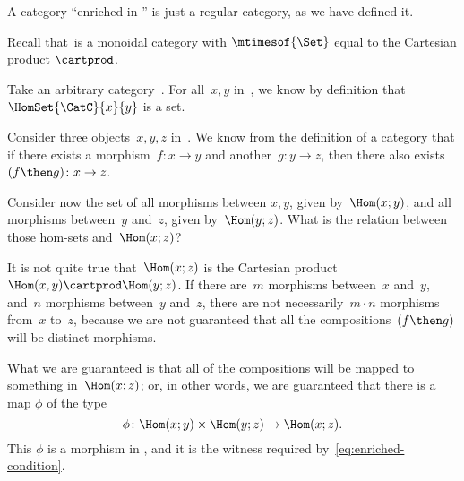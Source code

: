 \begin{example}
\end{example}

\begin{example}
    A category ``enriched in \Set'' is just a regular category, as we have defined it.

    Recall that~\Set is a monoidal category with $\mtimesof{\Set}$ equal to the Cartesian product $\cartprod$.

    Take an arbitrary category~\CatC.
    For all~$x, y$ in~\CatC, we know by definition that~$\HomSet{\CatC}{x}{y}$ is a set.

    Consider three objects~$x,y,z$ in~\CatC.
    We know from the definition of a category that if there exists a morphism~$f: x \to y$ and another~$g: y \to z$, then there also exists~$(f\then g)\colon x \to z$.

    Consider now the set of all morphisms between $x, y$, given by~$\Hom(x;y)$, and all morphisms between~$y$ and~$z$, given by~$\Hom(y; z)$.
    What is the relation between those hom-sets and~$\Hom(x; z)$?

    It is not quite true that~$\Hom(x; z)$ is the Cartesian product~$\Hom(x, y) \cartprod \Hom(y; z)$.
    If there are~$m$ morphisms between~$x$ and~$y$, and~$n$ morphisms between~$y$ and~$z$, there are not necessarily~$m \cdot n$ morphisms from~$x$ to~$z$, because we are not guaranteed that all the compositions~$(f\then g)$ will be distinct morphisms.

    What we are guaranteed is that all of the compositions will be mapped to something in~$\Hom(x; z)$; or, in other words, we are guaranteed that there is a map $\phi$ of the type
    \begin{equation*}
        \phi \colon \Hom(x; y) \times \Hom(y; z) \rightarrow \Hom(x; z).
    \end{equation*}
    This $\phi$ is a morphism in \Set, and it is the witness required by~\cref{eq:enriched-condition}.

\end{example}

